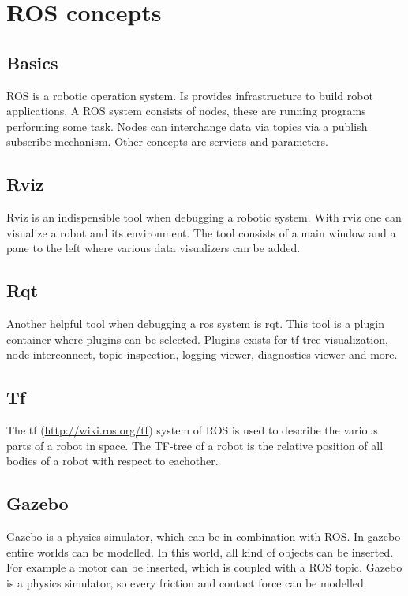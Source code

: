 \documentclass[a4paper]{article}
\begin{document}
\clearpage

\section{ROS concepts}
\subsection{Basics}
ROS is a robotic operation system. Is provides infrastructure to build robot applications.
A ROS system consists of nodes, these are running programs performing some task. Nodes can
interchange data via topics via a publish subscribe mechanism. Other concepts are services
and parameters.

\subsection{Rviz}
Rviz is an indispensible tool when debugging a robotic system. With rviz one can visualize a robot
and its environment. The tool consists of a main window and a pane to the left where various data
visualizers can be added.

\subsection{Rqt}
Another helpful tool when debugging a ros system is rqt. This tool is a plugin container where plugins
can be selected. Plugins exists for tf tree visualization, node interconnect, topic inspection,
logging viewer, diagnostics viewer and more.

\subsection{Tf}
The tf (\url{http://wiki.ros.org/tf}) system of ROS is used to describe the various parts of 
a robot in space. The TF-tree of a robot is the relative position of all bodies of a robot
with respect to eachother.

\subsection{Gazebo}
Gazebo is a physics simulator, which can be in combination with ROS. In gazebo entire worlds
can be modelled. In this world, all kind of objects can be inserted. For example a motor can
be inserted, which is coupled with a ROS topic. Gazebo is a physics simulator, so every friction
and contact force can be modelled.
\end{document}
